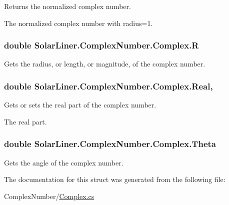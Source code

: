 Returns the normalized complex number. 

The normalized complex number with radius=1.
\subsubsection[{\texorpdfstring{R}{R}}]{\setlength{\rightskip}{0pt plus 5cm}double Solar\+Liner.\+Complex\+Number.\+Complex.\+R\hspace{0.3cm}{\ttfamily [get]}}\hypertarget{struct_solar_liner_1_1_complex_number_1_1_complex_ac522bdd16f688cb00d0dae9d8ec390ff}{}\label{struct_solar_liner_1_1_complex_number_1_1_complex_ac522bdd16f688cb00d0dae9d8ec390ff}


Gets the radius, or length, or magnitude, of the complex number. 

\subsubsection[{\texorpdfstring{Real}{Real}}]{\setlength{\rightskip}{0pt plus 5cm}double Solar\+Liner.\+Complex\+Number.\+Complex.\+Real\hspace{0.3cm}{\ttfamily [get]}, {\ttfamily [set]}}\hypertarget{struct_solar_liner_1_1_complex_number_1_1_complex_a00d6891103d4daf3e5d64e20205f202a}{}\label{struct_solar_liner_1_1_complex_number_1_1_complex_a00d6891103d4daf3e5d64e20205f202a}


Gets or sets the real part of the complex number. 

The real part.
\subsubsection[{\texorpdfstring{Theta}{Theta}}]{\setlength{\rightskip}{0pt plus 5cm}double Solar\+Liner.\+Complex\+Number.\+Complex.\+Theta\hspace{0.3cm}{\ttfamily [get]}}\hypertarget{struct_solar_liner_1_1_complex_number_1_1_complex_a1cfc2066453f861b4a04ba69a2f1ad39}{}\label{struct_solar_liner_1_1_complex_number_1_1_complex_a1cfc2066453f861b4a04ba69a2f1ad39}


Gets the angle of the complex number. 



The documentation for this struct was generated from the following file\+:\begin{DoxyCompactItemize}
\item 
Complex\+Number/\hyperlink{_complex_8cs}{Complex.\+cs}\end{DoxyCompactItemize}
